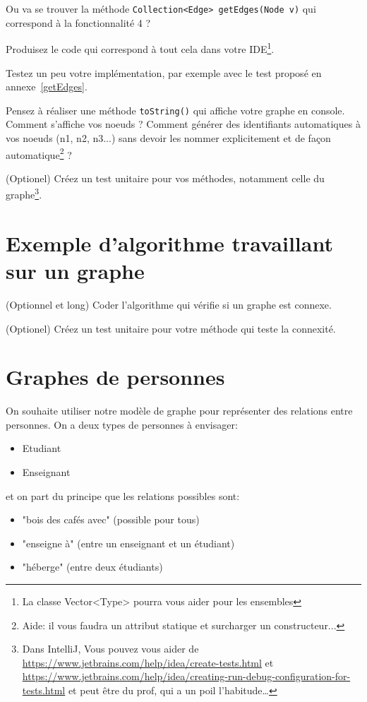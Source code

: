 \documentclass[11pt,TP,2A]{tdtp}
\begin{document}
\quest Ou va se trouver la méthode \verb+Collection<Edge> getEdges(Node v)+ qui correspond à la fonctionnalité 4 ?

\quest Produisez le code qui correspond à tout cela dans votre IDE\footnote{La classe Vector<Type> pourra vous aider pour les ensembles}.

\quest Testez un peu votre implémentation, par exemple avec le test proposé en annexe~\ref{getEdges}.

\quest Pensez à réaliser une méthode \verb+toString()+ qui affiche votre graphe en console. Comment s'affiche vos noeuds ? Comment générer des identifiants automatiques à vos noeuds (n1, n2, n3...) sans devoir les nommer explicitement et de façon automatique\footnote{Aide: il vous faudra un attribut statique et surcharger un constructeur...} ?

\quest (Optionel) Créez un test unitaire pour vos méthodes, notamment celle du graphe\footnote{Dans IntelliJ, Vous pouvez vous aider de \url{https://www.jetbrains.com/help/idea/create-tests.html} et \url{https://www.jetbrains.com/help/idea/creating-run-debug-configuration-for-tests.html} et peut être du prof, qui a un poil l'habitude\ldots}.

\section{Exemple d'algorithme travaillant sur un graphe}

\quest (Optionnel et long) Coder l'algorithme qui vérifie si un graphe est connexe.

\quest (Optionel) Créez un test unitaire pour votre méthode qui teste la connexité.

\section{Graphes de personnes}

On souhaite utiliser notre modèle de graphe pour représenter des relations entre personnes. On a deux types de personnes à envisager:

\begin{itemize}
\item Etudiant
\item Enseignant
\end{itemize}

et on part du principe que les relations possibles sont:

\begin{itemize}
\item "bois des cafés avec" (possible pour tous)
\item "enseigne à" (entre un enseignant et un étudiant)
\item "héberge" (entre deux étudiants)
\end{itemize}
\end{document}
